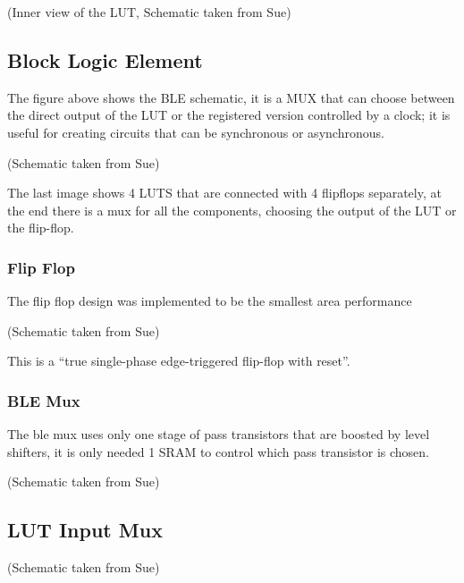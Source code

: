 \documentclass[letterpaper,10pt,english]{sphinxmanual}
\begin{document}
(Inner view of the LUT, Schematic taken from Sue)


\subsection{Block Logic Element}
\label{ble::doc}\label{ble:block-logic-element}
\noindent{}

The figure above shows the BLE schematic, it is a MUX that can choose between the direct output of the LUT or the registered version controlled by a clock; it is useful for creating circuits that can be synchronous or asynchronous.

\noindent{}

(Schematic taken from Sue)

The last image shows 4 LUTS that are connected with 4 flipflops separately, at the end there is a mux for all the components, choosing the output of the LUT or the flip-flop.


\subsubsection{Flip Flop}
\label{flipflop:flip-flop}\label{flipflop::doc}
The flip flop design was implemented to be the smallest area performance

\noindent{}

(Schematic taken from Sue)

This is a ``true single-phase edge-triggered flip-flop with reset''.


\subsubsection{BLE Mux}
\label{blemux::doc}\label{blemux:ble-mux}
The ble mux uses only one stage of pass transistors that are boosted by level shifters, it is only needed 1 SRAM to control which pass transistor is chosen.

\noindent{}

(Schematic taken from Sue)


\subsection{LUT Input Mux}
\label{lutinput:lut-input-mux}\label{lutinput::doc}
\noindent{}

(Schematic taken from Sue)
\end{document}
